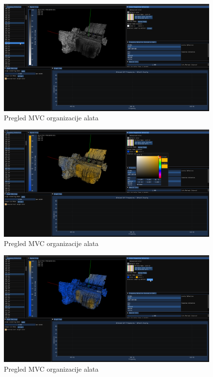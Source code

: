 \documentclass[times, utf8, diplomski]{fer}
\begin{document}
\begin{figure} [H]
	\centering
    \includegraphics[width=\textwidth]{demonstration/selected_frq.png}
    \caption{Pregled MVC organizacije alata}
    \label{fig:high-level-overview}
\end{figure}

\begin{figure} [H]
	\centering
    \includegraphics[width=\textwidth]{demonstration/color_select.png}
    \caption{Pregled MVC organizacije alata}
    \label{fig:high-level-overview}
\end{figure}

\begin{figure} [H]
	\centering
    \includegraphics[width=\textwidth]{demonstration/quartic_sampling_normal_mode.png}
    \caption{Pregled MVC organizacije alata}
    \label{fig:high-level-overview}
\end{figure}
\end{document}
